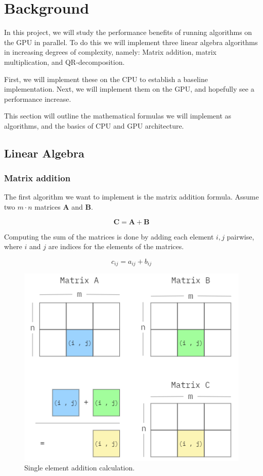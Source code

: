 \section{Background} \label{sect:backgroundw}

In this project, we will study the performance benefits of running algorithms on the GPU in parallel. To do this we will implement three linear algebra algorithms in increasing degrees of complexity, namely: Matrix addition, matrix multiplication, and QR-decomposition.


First, we will implement these on the CPU to establish a baseline implementation. Next, we will implement them on the GPU, and hopefully see a performance increase.

This section will outline the mathematical formulas we will implement as algorithms, and the basics of CPU and GPU architecture.

\subsection{Linear Algebra}

\subsubsection{Matrix addition}

The first algorithm we want to implement is the matrix addition formula. Assume two \(m \cdot n\) matrices \(\mathbf{A}\) and \(\mathbf{B}\). 

\[\mathbf{C} = \mathbf{A} + \mathbf{B}\]

Computing the sum of the matrices is done by adding each element \(i,j\) pairwise, where \(i\) and \(j\) are indices for the elements of the matrices.

\[c_{ij} = a_{ij} + b_{ij}\]

\begin{figure}[H]
\includegraphics[scale=.65]{Documents/Report/Figures/MatrixAddition.png}
\centering
\caption{Single element addition calculation.}
\label{fig:addition_illustration}
\end{figure}

